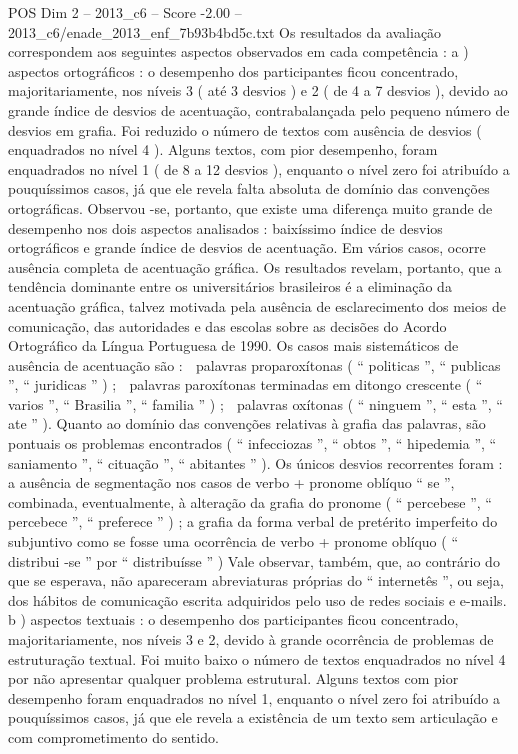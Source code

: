 \begin{textsample}{POS Dim 2 – 2013\_c6 – Score -2.00 – 2013\_c6/enade\_2013\_enf\_7b93b4bd5c.txt}
Os resultados da avaliação correspondem aos seguintes aspectos observados em cada competência : a ) aspectos ortográficos : o desempenho dos participantes ficou concentrado, majoritariamente, nos níveis 3 ( até 3 desvios ) e 2 ( de 4 a 7 desvios ), devido ao grande índice de desvios de acentuação, contrabalançada pelo pequeno número de desvios em grafia.
Foi reduzido o número de textos com ausência de desvios ( enquadrados no nível 4 ).
Alguns textos, com pior desempenho, foram enquadrados no nível 1 ( de 8 a 12 desvios ), enquanto o nível zero foi atribuído a pouquíssimos casos, já que ele revela falta absoluta de domínio das convenções ortográficas.
Observou -se, portanto, que existe uma diferença muito grande de desempenho nos dois aspectos analisados : baixíssimo índice de desvios ortográficos e grande índice de desvios de acentuação.
Em vários casos, ocorre ausência completa de acentuação gráfica.
Os resultados revelam, portanto, que a tendência dominante entre os universitários brasileiros é a eliminação da acentuação gráfica, talvez motivada pela ausência de esclarecimento dos meios de comunicação, das autoridades e das escolas sobre as decisões do Acordo Ortográfico da Língua Portuguesa de 1990.
Os casos mais sistemáticos de ausência de acentuação são :  palavras proparoxítonas ( “ politicas ”, “ publicas ”, “ juridicas ” ) ;  palavras paroxítonas terminadas em ditongo crescente ( “ varios ”, “ Brasilia ”, “ familia ” ) ;  palavras oxítonas ( “ ninguem ”, “ esta ”, “ ate ” ).
Quanto ao domínio das convenções relativas à grafia das palavras, são pontuais os problemas encontrados ( “ infecciozas ”, “ obtos ”, “ hipedemia ”, “ saniamento ”, “ cituação ”, “ abitantes ” ).
Os únicos desvios recorrentes foram : a ausência de segmentação nos casos de verbo + pronome oblíquo “ se ”, combinada, eventualmente, à alteração da grafia do pronome ( “ percebese ”, “ percebece ”, “ preferece ” ) ; a grafia da forma verbal de pretérito imperfeito do subjuntivo como se fosse uma ocorrência de verbo + pronome oblíquo ( “ distribui -se ” por “ distribuísse ” ) Vale observar, também, que, ao contrário do que se esperava, não apareceram abreviaturas próprias do “ internetês ”, ou seja, dos hábitos de comunicação escrita adquiridos pelo uso de redes sociais e e-mails. b ) aspectos textuais : o desempenho dos participantes ficou concentrado, majoritariamente, nos níveis 3 e 2, devido à grande ocorrência de problemas de estruturação textual.
Foi muito baixo o número de textos enquadrados no nível 4 por não apresentar qualquer problema estrutural.
Alguns textos com pior desempenho foram enquadrados no nível 1, enquanto o nível zero foi atribuído a pouquíssimos casos, já que ele revela a existência de um texto sem articulação e com comprometimento do sentido.

\end{textsample}
